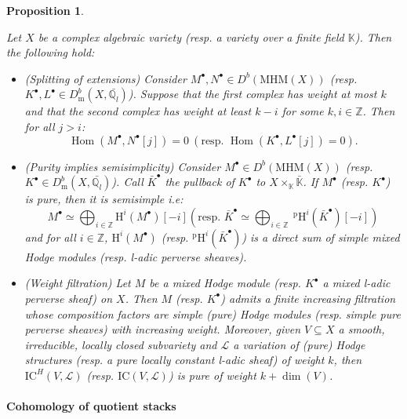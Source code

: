 \documentclass[11pt,english]{article}
\numberwithin{equation}{section}
\numberwithin{figure}{section}
\theoremstyle{definition}
\theoremstyle{plain}
\newtheorem{prop}[df]{Proposition}
\theoremstyle{remark}
\DeclareMathOperator{\Hom}{Hom}
\newcommand\HH{\mathrm{H}}
\newcommand\ZZ{\mathbb{Z}}
\newcommand\QQ{\mathbb{Q}}
\newcommand\KK{\mathbb{K}}
\begin{document}
\begin{prop} \label{Prop/WeightDecomp}

Let $X$ be a complex algebraic variety (resp. a variety over a finite
field $\KK$). Then the following hold:
\begin{itemize}
\item (Splitting of extensions) \cite[Cor. 1.10.]{Sai89}\cite[Prop. 12.4.]{KW01}
Consider $M^{\bullet},N^{\bullet}\in D^{b}(\mathrm{MHM}(X))$ (resp.
$K^{\bullet},L^{\bullet}\in D_{\mathrm{m}}^{b}(X,\bar{\QQ_{l}})$).
Suppose that the first complex has weight at most $k$ and that the
second complex has weight at least $k-i$ for some $k,i\in\ZZ$. Then
for all $j>i$:\[
\Hom(M^{\bullet},N^{\bullet}[j])=0 \  
(
\text{resp. }
\Hom(K^{\bullet},L^{\bullet}[j])=0
).
\]
\item (Purity implies semisimplicity) \cite[Cor. 1.11.]{Sai89}\cite[Thm. 10.6.]{KW01}
Consider $M^{\bullet}\in D^{b}(\mathrm{MHM}(X))$ (resp. $K^{\bullet}\in D_{\mathrm{m}}^{b}(X,\bar{\QQ_{l}})$).
Call $\bar{K}^{\bullet}$ the pullback of $K^{\bullet}$ to $X\times_{\KK}\bar{\KK}$.
If $M^{\bullet}$ (resp. $K^{\bullet}$) is pure, then it is semisimple
i.e:\[
M^{\bullet}\simeq\bigoplus_{i\in\ZZ}\HH^i(M^{\bullet})[-i]
\left(
\text{resp. }
\bar{K}^{\bullet}\simeq\bigoplus_{i\in\ZZ}\ ^{\mathrm{p}}\HH^i(\bar{K}^{\bullet})[-i]
\right)
\] and for all $i\in\ZZ$, $\HH^{i}(M^{\bullet})$ (resp. $^{\mathrm{p}}\HH^{i}(\bar{K}^{\bullet})$)
is a direct sum of simple mixed Hodge modules (resp. l-adic perverse
sheaves).
\item (Weight filtration) \cite[Thm. 14.31, Thm. 14.36.]{PS08}\cite[\S III.9 Lem. I, Lem. III.]{KW01}
Let $M$ be a mixed Hodge module (resp. $K^{\bullet}$ a mixed l-adic
perverse sheaf) on $X$. Then $M$ (resp. $K^{\bullet}$) admits a
finite increasing filtration whose composition factors are simple
(pure) Hodge modules (resp. simple pure perverse sheaves) with increasing
weight. Moreover, given $V\subseteq X$ a smooth, irreducible, locally
closed subvariety and $\mathcal{L}$ a variation of (pure) Hodge structures
(resp. a pure locally constant l-adic sheaf) of weight $k$, then
$\mathrm{IC}^{H}(V,\mathcal{L})$ (resp. $\mathrm{IC}(V,\mathcal{L})$)
is pure of weight $k+\dim(V)$.
\end{itemize}
\end{prop}

\paragraph*{Cohomology of quotient stacks}
\end{document}
